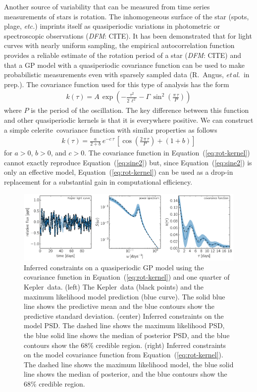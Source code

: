 \documentclass[manuscript, letterpaper]{aastex6}
\newcommand{\project}[1]{\textsf{#1}}
\newcommand{\kepler}{\project{Kepler}}
\newcommand{\celerite}{\project{celerite}}
\newcommand{\foreign}[1]{\emph{#1}}
\newcommand{\etal}{\foreign{et\,al.}}
\newcommand{\etc}{\foreign{etc.}}
\newcommand{\figurelabel}[1]{\label{fig:#1}}
\renewcommand{\eqref}[1]{\ref{eq:#1}}
\newcommand{\Eq}[1]{Equation~(\eqref{#1})}
\newcommand{\eq}[1]{\Eq{#1}}
\newcommand{\eqlabel}[1]{\label{eq:#1}}
\newcommand{\todo}[3]{{\color{#2}\emph{#1}: #3}}
\newcommand{\dfmtodo}[1]{\todo{DFM}{red}{#1}}
\begin{document}
Another source of variability that can be measured from time series
measurements of stars is rotation.
The inhomogeneous surface of the star (spots, plage, \etc) imprints itself as
quasiperiodic variations in photometric or spectroscopic observations
(\dfmtodo{CITE}).
It has been demonstrated that for light curves with nearly uniform sampling,
the empirical autocorrelation function provides a reliable estimate of the
rotation period of a star (\dfmtodo{CITE}) and that a GP model with a
quasiperiodic covariance function can be used to make probabilistic
measurements even with sparsely sampled data (R.~Angus, \etal\ in prep.).
The covariance function used for this type of analysis has the form
\begin{eqnarray}\eqlabel{sine2}
k(\tau) = A\,\exp\left(-\frac{\tau^2}{2\,\ell^2} -
    \Gamma\,\sin^2\left(\frac{\pi\,\tau}{P} \right) \right)
\end{eqnarray}
where $P$ is the period of the oscillation.
The key difference between this function and other quasiperiodic kernels is
that it is everywhere positive.
We can construct a simple \celerite\ covariance function with similar properties
as follows
\begin{eqnarray}\eqlabel{rot-kernel}
k(\tau) = \frac{a}{2+b}\,e^{-c\,\tau}\,\left[
    \cos\left(\frac{2\,\pi\,\tau}{P}\right) + (1 + b)
\right]
\end{eqnarray}
for $a>0$, $b>0$, and $c>0$.
The covariance function in \eq{rot-kernel} cannot exactly reproduce \eq{sine2}
but, since \eq{sine2} is only an effective model, \eq{rot-kernel} can be used
as a drop-in replacement for a substantial gain in computational efficiency.

\begin{figure}[!htbp]
\begin{center}
\includegraphics[width=\textwidth]{figures/rotation.pdf}
\caption{Inferred constraints on a quasiperiodic GP model using the covariance
    function in \eq{rot-kernel} and one quarter of \kepler\ data.
(left) The \kepler\ data (black points) and the maximum likelihood model
    prediction (blue curve).
    The solid blue line shows the predictive mean and the blue contours show
    the predictive standard deviation.
(center) Inferred constraints on the model PSD.
    The dashed line shows the maximum likelihood PSD, the blue solid line
    shows the median of posterior PSD, and the blue contours show the 68\%
    credible region.
(right) Inferred constraints on the model covariance function from
    \eq{rot-kernel}.
    The dashed line shows the maximum likelihood model, the blue solid line
    shows the median of posterior, and the blue contours show the 68\%
    credible region.
    \figurelabel{rotation}}
\end{center}
\end{figure}
\end{document}
